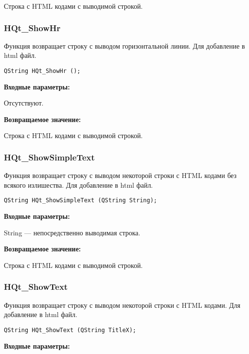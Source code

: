 \documentclass[a4paper,12pt]{article}
\begin{document}
Строка с HTML кодами с выводимой строкой.


\subsubsection{HQt\_ShowHr}\label{HQt_ShowHr}

Функция возвращает строку с выводом горизонтальной линии. Для добавление в html файл.


\begin{lstlisting}[label=code_syntax_HQt_ShowHr,caption=Синтаксис]
QString HQt_ShowHr ();
\end{lstlisting}

\textbf{Входные параметры:}

Отсутствуют.

\textbf{Возвращаемое значение:}

Строка с HTML кодами с выводимой строкой.


\subsubsection{HQt\_ShowSimpleText}\label{HQt_ShowSimpleText}

Функция возвращает строку с выводом некоторой строки с HTML кодами без всякого излишества. Для добавление в html файл.


\begin{lstlisting}[label=code_syntax_HQt_ShowSimpleText,caption=Синтаксис]
QString HQt_ShowSimpleText (QString String);
\end{lstlisting}

\textbf{Входные параметры:}

String --- непосредственно выводимая строка.

\textbf{Возвращаемое значение:}

Строка с HTML кодами с выводимой строкой.


\subsubsection{HQt\_ShowText}\label{HQt_ShowText}

Функция возвращает строку с выводом некоторой строки с HTML кодами. Для добавление в html файл.


\begin{lstlisting}[label=code_syntax_HQt_ShowText,caption=Синтаксис]
QString HQt_ShowText (QString TitleX);
\end{lstlisting}

\textbf{Входные параметры:}
\end{document}
